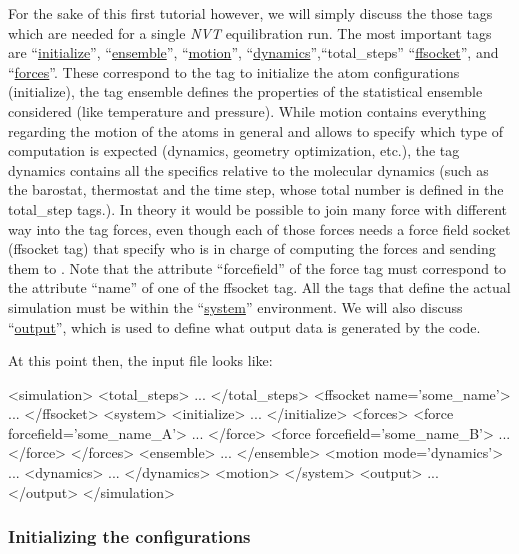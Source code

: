 \documentclass[11pt,english,fleqn]{report}
\newenvironment{code}{%
\footnotesize 
\verbatim
}{
\endverbatim
\normalsize
}
\begin{document}
For the sake of this first tutorial however, we will simply discuss the
those tags which are needed for a single \emph{NVT} equilibration run.
The most important tags are {}``\hyperref[INITIALIZER]{initialize}'', 
{}``\hyperref[ENSEMBLE]{ensemble}'', {}``\hyperref[MOTION]{motion}'', 
{}``\hyperref[DYNAMICS]{dynamics}'',{}``total\_steps''
{}``\hyperref[FFSOCKET]{ffsocket}'',
 and {}``\hyperref[FORCES]{forces}''.
These correspond to the tag to initialize the atom configurations (initialize),
the tag ensemble defines the properties of the statistical ensemble considered (like
temperature and pressure). While motion contains everything regarding
the motion of the atoms in general and allows to specify
which type of computation is expected (dynamics, geometry
optimization, etc.), the tag dynamics contains all the specifics
relative to the molecular dynamics (such as the barostat,
thermostat and the time step, whose total number is defined in
the total\_step tags.). In theory it would be possible to join many
force with different way into the tag forces, even though each of those
forces needs a force field socket (ffsocket tag) that specify who is
in charge of computing the forces and sending them to \ipi.  Note that
the attribute ``forcefield'' of the force tag must correspond to the
attribute ``name'' of one of the ffsocket tag. All the tags that
define the actual simulation must be within the {}``\hyperref[SYSTEM]{system}''
environment.
We will also discuss {}``\hyperref[OUTPUTS]{output}'', 
which is used to define what output data
is generated by the code.

At this point then, the input file looks like:

\begin{code}
<simulation>
   <total_steps>
      ...
   </total_steps>
   <ffsocket name='some_name'>
      ...
   </ffsocket>
   <system>
      <initialize>
         ...
      </initialize>
      <forces>
         <force forcefield='some_name_A'>
            ...
         </force>
         <force forcefield='some_name_B'>
            ...
         </force>
      </forces>
      <ensemble>
         ...
      </ensemble>
      <motion mode='dynamics'>
         ...
         <dynamics>
            ...
         </dynamics>
      <motion>
   </system>
   <output>
      ...
   </output>
</simulation>
\end{code}

\subsubsection{Initializing the configurations}
\end{document}
